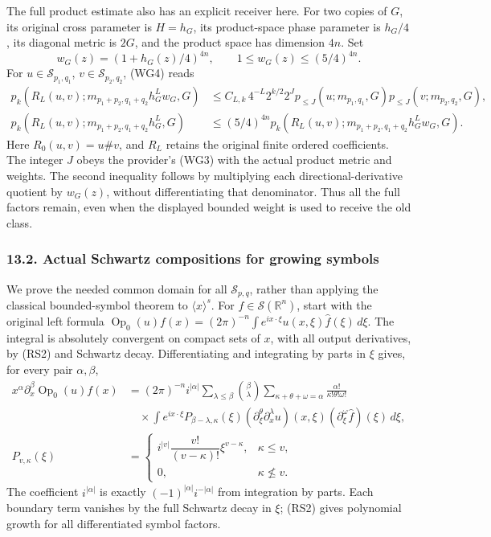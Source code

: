 \documentclass[
  11pt,
]{article}
\begin{document}
The full product estimate also has an explicit receiver here. For two
copies of \(G\), its original cross parameter is \(H=h_G\), its
product-space phase parameter is \(h_G/4\), its diagonal metric is
\(2G\), and the product space has dimension \(4n\). Set \[
 w_G(z)=(1+h_G(z)/4)^{4n},\qquad
 1\leq w_G(z)\leq(5/4)^{4n}.
 \tag{RS5}
\] For \(u\in\mathcal S_{p_1,q_1}\), \(v\in\mathcal S_{p_2,q_2}\), (WG4)
reads \[
 \begin{split}
 p_k\!\left(R_L(u,v);
        m_{p_1+p_2,q_1+q_2}h_G^Lw_G,G\right)
 &\leq C_{L,k}\,4^{-L}2^{k/2}2^J
       p_{\leq J}(u;m_{p_1,q_1},G)
       p_{\leq J}(v;m_{p_2,q_2},G),\\
 p_k\!\left(R_L(u,v);
        m_{p_1+p_2,q_1+q_2}h_G^L,G\right)
 &\leq(5/4)^{4n}
       p_k\!\left(R_L(u,v);
        m_{p_1+p_2,q_1+q_2}h_G^Lw_G,G\right).
 \end{split}
 \tag{RS6}
\] Here \(R_0(u,v)=u\#v\), and \(R_L\) retains the original finite
ordered coefficients. The integer \(J\) obeys the provider's (WG3) with
the actual product metric and weights. The second inequality follows by
multiplying each directional-derivative quotient by \(w_G(z)\), without
differentiating that denominator. Thus all the full factors remain, even
when the displayed bounded weight is used to receive the old class.

\subsubsection{13.2. Actual Schwartz compositions for growing
symbols}\label{actual-schwartz-compositions-for-growing-symbols}

We prove the needed common domain for all \(\mathcal S_{p,q}\), rather
than applying the classical bounded-symbol theorem to
\(\langle x\rangle^s\). For \(f\in\mathcal S(\mathbb R^n)\), start with
the original left formula
\(\operatorname{Op}_0(u)f(x)=(2\pi)^{-n}\int e^{ix\cdot\xi}u(x,\xi)\widehat f(\xi)\,d\xi\).
The integral is absolutely convergent on compact sets of \(x\), with all
output derivatives, by (RS2) and Schwartz decay. Differentiating and
integrating by parts in \(\xi\) gives, for every pair \(\alpha,\beta\),
\[
 \begin{split}
 x^\alpha\partial_x^\beta\operatorname{Op}_0(u)f(x)
 &=(2\pi)^{-n}i^{|\alpha|}
   \sum_{\lambda\leq\beta}\binom{\beta}{\lambda}
   \sum_{\kappa+\theta+\omega=\alpha}
        \frac{\alpha!}{\kappa!\theta!\omega!}\\
 &\quad\times\int e^{ix\cdot\xi}
       P_{\beta-\lambda,\kappa}(\xi)
       (\partial_\xi^\theta\partial_x^\lambda u)(x,\xi)
       (\partial_\xi^\omega\widehat f)(\xi)\,d\xi,\\
 P_{v,\kappa}(\xi)
 &=\begin{cases}
 i^{|v|}\dfrac{v!}{(v-\kappa)!}\xi^{v-\kappa},
                  &\kappa\leq v,\\
 0,&\kappa\not\leq v.
 \end{cases}
 \end{split}
 \tag{RS7}
\] The coefficient \(i^{|\alpha|}\) is exactly
\((-1)^{|\alpha|}i^{-|\alpha|}\) from integration by parts. Each
boundary term vanishes by the full Schwartz decay in \(\xi\); (RS2)
gives polynomial growth for all differentiated symbol factors.
\end{document}
